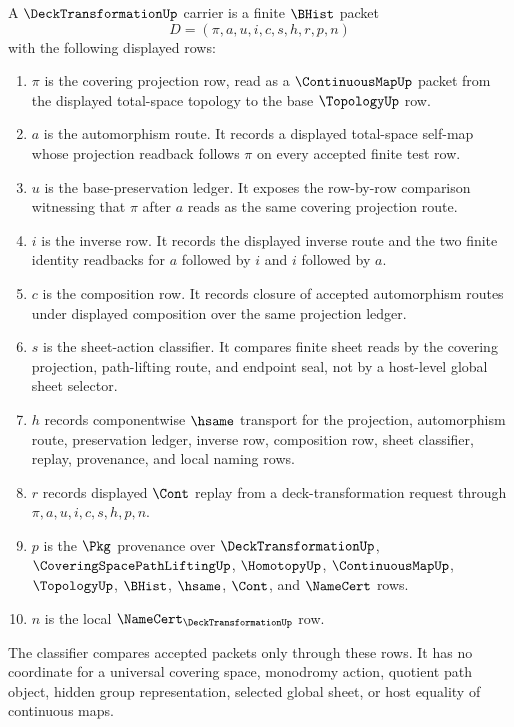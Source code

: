 \begin{definition}
\label{def:deck-transformation-carrier}
A $\DeckTransformationUp$ carrier is a finite $\BHist$ packet
$$
D=(\pi,a,u,i,c,s,h,r,p,n)
$$
with the following displayed rows:
\begin{enumerate}
\item $\pi$ is the covering projection row, read as a $\ContinuousMapUp$ packet from the displayed total-space topology to the base $\TopologyUp$ row.
\item $a$ is the automorphism route. It records a displayed total-space self-map whose projection readback follows $\pi$ on every accepted finite test row.
\item $u$ is the base-preservation ledger. It exposes the row-by-row comparison witnessing that $\pi$ after $a$ reads as the same covering projection route.
\item $i$ is the inverse row. It records the displayed inverse route and the two finite identity readbacks for $a$ followed by $i$ and $i$ followed by $a$.
\item $c$ is the composition row. It records closure of accepted automorphism routes under displayed composition over the same projection ledger.
\item $s$ is the sheet-action classifier. It compares finite sheet reads by the covering projection, path-lifting route, and endpoint seal, not by a host-level global sheet selector.
\item $h$ records componentwise $\hsame$ transport for the projection, automorphism route, preservation ledger, inverse row, composition row, sheet classifier, replay, provenance, and local naming rows.
\item $r$ records displayed $\Cont$ replay from a deck-transformation request through $\pi,a,u,i,c,s,h,p,n$.
\item $p$ is the $\Pkg$ provenance over $\DeckTransformationUp$, $\CoveringSpacePathLiftingUp$, $\HomotopyUp$, $\ContinuousMapUp$, $\TopologyUp$, $\BHist$, $\hsame$, $\Cont$, and $\NameCert$ rows.
\item $n$ is the local $\NameCert_{\DeckTransformationUp}$ row.
\end{enumerate}
The classifier compares accepted packets only through these rows. It has no coordinate for a universal covering space, monodromy action, quotient path object, hidden group representation, selected global sheet, or host equality of continuous maps.
\end{definition}

